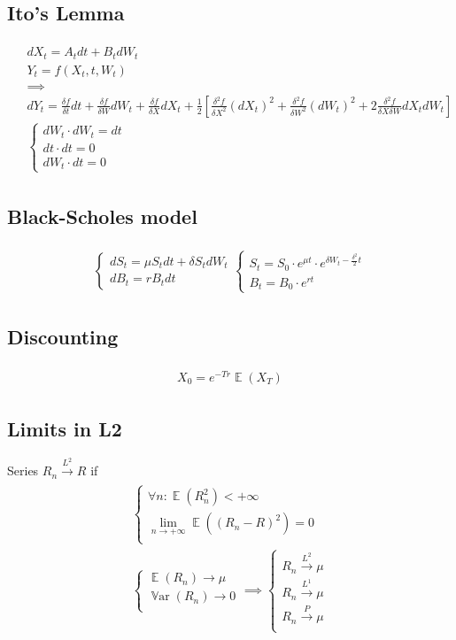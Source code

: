 \documentclass{article}
\def\Var#1{{\operatorname{\mathbb{V}ar} \left({#1}\right)}}
\def\Exp#1{{\operatorname{\mathbb{E}} \left({#1}\right)}}
\def\Eq#1{{\begin{gather}\begin{split} #1 \end{split}\end{gather}}}
\begin{document}
\subsection*{Ito's Lemma} 
\Eq{
    &dX_t = A_t dt + B_t dW_t \\
    &Y_t = f(X_t, t, W_t) \\
    & \implies \\
    &dY_t = \frac{\delta f}{\delta t} dt + \frac{\delta f}{\delta W}dW_t + \frac{\delta f}{\delta X}dX_t + \frac{1}{2}\left[\frac{\delta^2 f}{\delta X^2}(dX_t)^2 + \frac{\delta^2 f}{\delta W^2}(dW_t)^2 + 2\frac{\delta^2 f}{\delta X \delta W}dX_t dW_t\right]\\
    &\begin{cases}
        dW_t \cdot dW_t = dt\\
        dt \cdot dt = 0\\
        dW_t \cdot dt = 0
    \end{cases}
}
\begin{multicols}{2}
\subsection*{Black-Scholes model}
\Eq{
    \begin{cases}
    dS_t = \mu S_t dt + \delta S_t dW_t \\
    dB_t = rB_t dt
    \end{cases}
    \begin{cases}
    S_t = S_0 \cdot e^{\mu t} \cdot e^{\delta W_t - \frac{\delta^2}{2}t} \\
    B_t = B_0 \cdot e ^ {r t}
    \end{cases}
}

    \subsection*{Discounting}
\Eq{
X_0 = e^{-T r}\Exp{X_T}
}
\end{multicols}

\begin{multicols}{2}
    \subsection*{Limits in L2}
Series $R_n \xrightarrow{L^2} R$ if
\Eq{
\begin{cases}
\forall n : \Exp{R_n^2} < +\infty \\
\lim\limits_{n \to +\infty} \Exp{(R_n - R)^2} = 0 \\
\end{cases} \\
\begin{cases}
\Exp{R_n} \rightarrow \mu \\
\Var{R_n} \rightarrow 0 \\
\end{cases}
\implies
\begin{cases}
R_n \xrightarrow{L^2} \mu \\
R_n \xrightarrow{L^1} \mu \\
R_n \xrightarrow{P} \mu \\
\end{cases}
}
\end{multicols}
\end{document}
